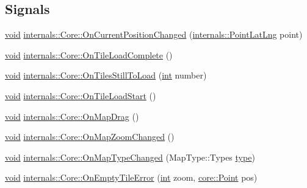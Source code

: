 \subsection*{Signals}
\begin{DoxyCompactItemize}
\item 
\hyperlink{group___u_a_v_objects_plugin_ga444cf2ff3f0ecbe028adce838d373f5c}{void} \hyperlink{group___o_p_map_widget_ga2491a90fa3143792bc6f14153750d5d2}{internals\-::\-Core\-::\-On\-Current\-Position\-Changed} (\hyperlink{structinternals_1_1_point_lat_lng}{internals\-::\-Point\-Lat\-Lng} point)
\item 
\hyperlink{group___u_a_v_objects_plugin_ga444cf2ff3f0ecbe028adce838d373f5c}{void} \hyperlink{group___o_p_map_widget_gac03cc68ae31948f87512df9b4b25a104}{internals\-::\-Core\-::\-On\-Tile\-Load\-Complete} ()
\item 
\hyperlink{group___u_a_v_objects_plugin_ga444cf2ff3f0ecbe028adce838d373f5c}{void} \hyperlink{group___o_p_map_widget_ga8fbc5fa54e3d35c3008d0117c998638e}{internals\-::\-Core\-::\-On\-Tiles\-Still\-To\-Load} (\hyperlink{ioapi_8h_a787fa3cf048117ba7123753c1e74fcd6}{int} number)
\item 
\hyperlink{group___u_a_v_objects_plugin_ga444cf2ff3f0ecbe028adce838d373f5c}{void} \hyperlink{group___o_p_map_widget_gae5debcd025be8ef286b44c846bcf307d}{internals\-::\-Core\-::\-On\-Tile\-Load\-Start} ()
\item 
\hyperlink{group___u_a_v_objects_plugin_ga444cf2ff3f0ecbe028adce838d373f5c}{void} \hyperlink{group___o_p_map_widget_ga86c23f03f213d9cdd416259faa5e1835}{internals\-::\-Core\-::\-On\-Map\-Drag} ()
\item 
\hyperlink{group___u_a_v_objects_plugin_ga444cf2ff3f0ecbe028adce838d373f5c}{void} \hyperlink{group___o_p_map_widget_ga79ea52272693c681261bee7f02cdd9a4}{internals\-::\-Core\-::\-On\-Map\-Zoom\-Changed} ()
\item 
\hyperlink{group___u_a_v_objects_plugin_ga444cf2ff3f0ecbe028adce838d373f5c}{void} \hyperlink{group___o_p_map_widget_ga9be685397ee72f5e1ecc2694b61d0819}{internals\-::\-Core\-::\-On\-Map\-Type\-Changed} (Map\-Type\-::\-Types \hyperlink{glext_8h_a7d05960f4f1c1b11f3177dc963a45d86}{type})
\item 
\hyperlink{group___u_a_v_objects_plugin_ga444cf2ff3f0ecbe028adce838d373f5c}{void} \hyperlink{group___o_p_map_widget_ga0b750ffa3c184237b9625bdb9fa8c2c8}{internals\-::\-Core\-::\-On\-Empty\-Tile\-Error} (\hyperlink{ioapi_8h_a787fa3cf048117ba7123753c1e74fcd6}{int} zoom, \hyperlink{structcore_1_1_point}{core\-::\-Point} pos)

\end{DoxyCompactItemize}
